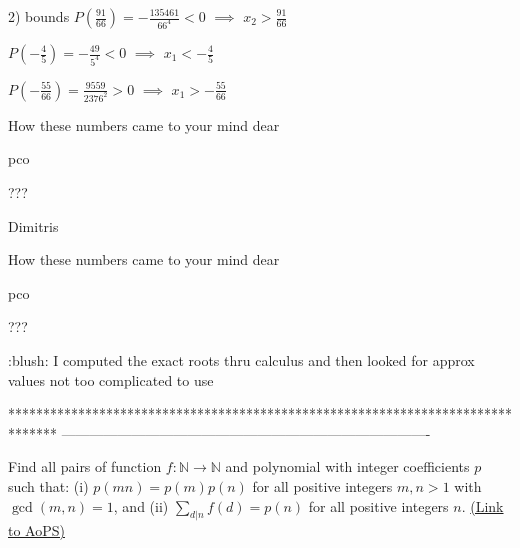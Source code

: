 \begin{solution}
	\begin{tcolorbox}
2) bounds
$ P(\frac {91}{66}) = - \frac {135461}{66^4} < 0$ $ \implies$ $ x_2 > \frac {91}{66}$

$ P( - \frac 45) = - \frac {49}{5^4} < 0$ $ \implies$ $ x_1 < - \frac 45$

$ P( - \frac {55}{66}) = \frac {9559}{2376^2} > 0$ $ \implies$ $ x_1 > - \frac {55}{66}$

\end{tcolorbox}
How these numbers came to your mind dear \begin{bolded}pco\end{bolded}???

Dimitris
\end{solution}



\begin{solution}
	\begin{tcolorbox}How these numbers came to your mind dear \begin{bolded}pco\end{bolded}???\end{tcolorbox}

 :blush: I computed the exact roots thru calculus and then looked for approx values not too complicated to use
\end{solution}
*******************************************************************************
-------------------------------------------------------------------------------

\begin{problem}
	Find all pairs of function $ f: \mathbb{N} \rightarrow \mathbb{N}$ and polynomial with integer coefficients $ p$ such that:
(i) $ p(mn) = p(m)p(n)$ for all positive integers $ m,n > 1$ with $ \gcd(m,n) = 1$, and
(ii) $ \sum_{d|n}f(d) = p(n)$ for all positive integers $ n$.
	\flushright \href{https://artofproblemsolving.com/community/c6h312088}{(Link to AoPS)}
\end{problem}



